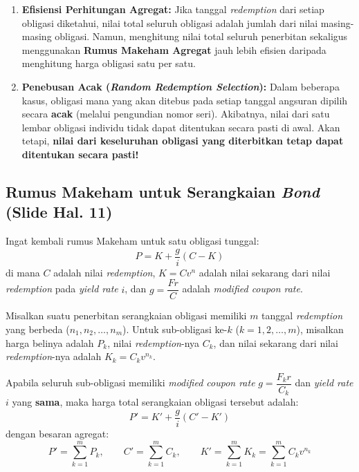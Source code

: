 \documentclass[11pt,a4paper]{article}
\begin{document}
\begin{notebox}
\begin{enumerate}[label=\textbf{\arabic*.}]
    \item \textbf{Efisiensi Perhitungan Agregat:} Jika tanggal \textit{redemption} dari setiap obligasi diketahui, nilai total seluruh obligasi adalah jumlah dari nilai masing-masing obligasi. Namun, menghitung nilai total seluruh penerbitan sekaligus menggunakan \textbf{Rumus Makeham Agregat} jauh lebih efisien daripada menghitung harga obligasi satu per satu.
    \item \textbf{Penebusan Acak (\textit{Random Redemption Selection}):} Dalam beberapa kasus, obligasi mana yang akan ditebus pada setiap tanggal angsuran dipilih secara \textbf{acak} (melalui pengundian nomor seri). Akibatnya, nilai dari satu lembar obligasi individu tidak dapat ditentukan secara pasti di awal. Akan tetapi, \textbf{nilai dari keseluruhan obligasi yang diterbitkan tetap dapat ditentukan secara pasti!}
\end{enumerate}
\end{notebox}

\subsection{Rumus Makeham untuk Serangkaian \textit{Bond} (Slide Hal. 11)}

Ingat kembali rumus Makeham untuk satu obligasi tunggal:
\begin{equation}
    P = K + \frac{g}{i}(C - K)
\end{equation}
di mana $C$ adalah nilai \textit{redemption}, $K = C v^n$ adalah nilai sekarang dari nilai \textit{redemption} pada \textit{yield rate} $i$, dan $g = \dfrac{Fr}{C}$ adalah \textit{modified coupon rate}.

\begin{theorembox}
Misalkan suatu penerbitan serangkaian obligasi memiliki $m$ tanggal \textit{redemption} yang berbeda ($n_1, n_2, \dots, n_m$). Untuk sub-obligasi ke-$k$ ($k = 1, 2, \dots, m$), misalkan harga belinya adalah $P_k$, nilai \textit{redemption}-nya $C_k$, dan nilai sekarang dari nilai \textit{redemption}-nya adalah $K_k = C_k v^{n_k}$.

Apabila seluruh sub-obligasi memiliki \textit{modified coupon rate} $g = \dfrac{F_k r}{C_k}$ dan \textit{yield rate} $i$ yang \textbf{sama}, maka harga total serangkaian obligasi tersebut adalah:
\begin{equation}
    P' = K' + \frac{g}{i}\left(C' - K'\right)
\end{equation}
dengan besaran agregat:
\begin{equation}
    P' = \sum_{k=1}^m P_k, \qquad C' = \sum_{k=1}^m C_k, \qquad K' = \sum_{k=1}^m K_k = \sum_{k=1}^m C_k v^{n_k}
\end{equation}
\end{theorembox}
\end{document}
